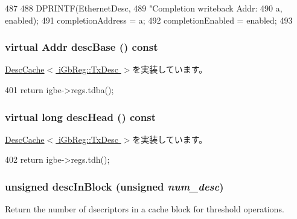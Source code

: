 \begin{DoxyCode}
487                                                        {
488             DPRINTF(EthernetDesc,
489                     "Completion writeback Addr: %
490                     a, enabled);
491             completionAddress = a;
492             completionEnabled = enabled;
493         }
\end{DoxyCode}
\hypertarget{classIGbE_1_1TxDescCache_ae5a77c90557026fdf4fd78883f92bef9}{
\subsubsection[{descBase}]{\setlength{\rightskip}{0pt plus 5cm}virtual {\bf Addr} descBase () const}}
\label{classIGbE_1_1TxDescCache_ae5a77c90557026fdf4fd78883f92bef9}


\hyperlink{classIGbE_1_1DescCache_aa8bdc83aee2be5e0eaa7a1f7f1f284e2}{DescCache$<$ iGbReg::TxDesc $>$}を実装しています。


\begin{DoxyCode}
401 { return igbe->regs.tdba(); }
\end{DoxyCode}
\hypertarget{classIGbE_1_1TxDescCache_af3d1877b6f30bdf98b95351c38d400f3}{
\subsubsection[{descHead}]{\setlength{\rightskip}{0pt plus 5cm}virtual long descHead () const}}
\label{classIGbE_1_1TxDescCache_af3d1877b6f30bdf98b95351c38d400f3}


\hyperlink{classIGbE_1_1DescCache_af413050780b6b8b2fe0793fff12037e3}{DescCache$<$ iGbReg::TxDesc $>$}を実装しています。


\begin{DoxyCode}
402 { return igbe->regs.tdh(); }
\end{DoxyCode}
\hypertarget{classIGbE_1_1TxDescCache_a6fb0bd6d34eae6de55fb211662f92180}{
\subsubsection[{descInBlock}]{\setlength{\rightskip}{0pt plus 5cm}unsigned descInBlock (unsigned {\em num\_\-desc})}}
\label{classIGbE_1_1TxDescCache_a6fb0bd6d34eae6de55fb211662f92180}
Return the number of dsecriptors in a cache block for threshold operations. 


